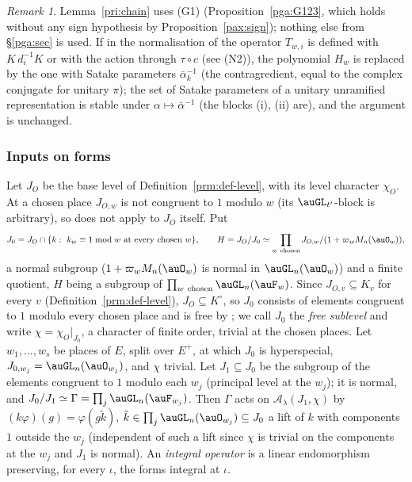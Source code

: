 \documentclass[10pt]{amsart}
\theoremstyle{definition}
\theoremstyle{remark}
\newtheorem{remark}[theorem]{Remark}
\begin{document}
\begin{remark}\label{pax:rem-chain-sign}
Lemma~\ref{pri:chain} uses (G1) (Proposition~\ref{pga:G123}, which holds without any sign
hypothesis by Proposition~\ref{pax:sign}); nothing else from \S\ref{pga:sec} is used. If in the normalisation of
{\cite[\S14.3]{P46}} the operator $T_{w,i}$ is defined with $K\,d_i^{-1}K$ or with the action through
$\tau\circ c$ (see (N2)), the polynomial $H_w$ is replaced by the one with Satake parameters
$\bar\alpha_k^{-1}$ (the contragredient, equal to the complex conjugate for unitary $\pi$); the set of
Satake parameters of a unitary unramified representation is stable under $\alpha\mapsto\bar\alpha^{-1}$
(the blocks (i), (ii) are), and the argument is unchanged.
\end{remark}

\subsubsection{Inputs on forms}\label{pax:ss-forms}

Let $J_O$ be the base level of Definition~\ref{prm:def-level}, with its level character $\chi_O$. At a
chosen place $J_{O,w}$ is not congruent to $1$ modulo $w$ (its $\auGL_{t'}$-block is arbitrary), so
{\cite[Lemma~14.5]{P46}} does not apply to $J_O$ itself. Put
\[
J_0=J_O\cap\{k:\ k_w\equiv1\bmod w\ \text{at every chosen }w\},\qquad H=J_O/J_0\simeq\prod_{w\ \mathrm{chosen}}
J_{O,w}/(1+\varpi_wM_n(\auO_w)),
\]
a normal subgroup ($1+\varpi_wM_n(\auO_w)$ is normal in $\auGL_n(\auO_w)$) and a finite quotient, $H$
being a subgroup of $\prod_{w\ \mathrm{chosen}}\auGL_n(\auF_w)$. Since $J_{O,v}\subseteq K_v$ for every $v$ (Definition~\ref{prm:def-level}), $J_O\subseteq K^\circ$, so
 $J_0$ consists of elements congruent to $1$ modulo every chosen place and is free by
{\cite[Lemma~14.5]{P46}}; we call $J_0$ the \emph{free sublevel} and write $\chi=\chi_O|_{J_0}$, a character of
finite order, trivial at the chosen places. Let $w_1,\dots,w_s$ be
places of $E$, split over $E^+$, at which $J_0$ is hyperspecial, $J_{0,w_j}=\auGL_n(\auO_{w_j})$, and
$\chi$ trivial. Let $J_1\subseteq J_0$ be the subgroup of the elements congruent to $1$ modulo each
$w_j$ (principal level at the $w_j$); it is normal, and $J_0/J_1\simeq\Gamma=\prod_j\auGL_n(
\auF_{w_j})$. Then $\Gamma$ acts on $\mathcal A_\lambda(J_1,\chi)$ by $(k\varphi)(g)=\varphi(g\tilde k)$,
$\tilde k\in\prod_j\auGL_n(\auO_{w_j})\subseteq J_0$ a lift of $k$ with components $1$ outside the $w_j$ (independent of such a lift since $\chi$ is trivial on the components at
the $w_j$ and $J_1$ is normal). An \emph{integral operator} is a linear endomorphism preserving, for
every $\iota$, the forms integral at $\iota$.
\end{document}
